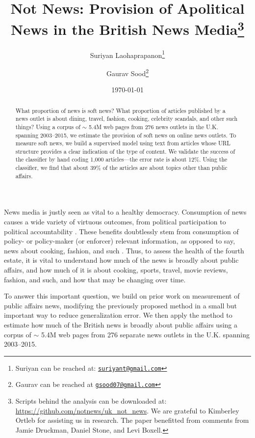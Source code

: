 \documentclass[12pt, letterpaper]{article}
\title{\Large{Not News: Provision of Apolitical News in the British News Media}\footnote{Scripts behind the analysis can be downloaded at: \url{https://github.com/notnews/uk_not_news}. We are grateful to Kimberley Ortleb for assisting us in research. The paper benefitted from comments from Jamie Druckman, Daniel Stone, and Levi Boxell.}}
\author{Suriyan Laohaprapanon\thanks{Suriyan can be reached at: \href{mailto:suriyant@gmail.com}{\footnotesize{\texttt{suriyant@gmail.com}}}}\vspace{.5cm} \and Gaurav Sood\thanks{Gaurav can be reached at \href{mailto:gsood07@gmail.com}{\footnotesize{\texttt{gsood07@gmail.com}}}}}
\date{\vspace{.5cm}\normalsize{\today}}
\begin{document}
\maketitle

\begin{abstract}
\noindent What proportion of news is soft news? What proportion of articles published by a news outlet is about dining, travel, fashion, cooking, celebrity scandals, and other such things? Using a corpus of $\sim$ 5.4M web pages from 276 news outlets in the U.K. spanning 2003--2015, we estimate the provision of soft news on online news outlets. To measure soft news, we build a supervised model using text from articles whose URL structure provides a clear indication of the type of content. We validate the success of the classifier by hand coding 1,000 articles---the error rate is about 12\%. Using the classifier, we find that about 39\% of the articles are about topics other than public affairs. 
\end{abstract}

\clearpage
\doublespacing

News media is justly seen as vital to a healthy democracy. Consumption of news causes a wide variety of virtuous outcomes, from political participation to political accountability \citep{gentzkow2015, oberholzer2006media, snyder2008press, stromberg2004radio}. These benefits doubtlessly stem from consumption of policy- or policy-maker (or enforcer) relevant information, as opposed to say, news about cooking, fashion, and such \citep[see, for instance,][]{prior2003}. Thus, to assess the health of the fourth estate, it is vital to understand how much of the news is broadly about public affairs, and how much of it is about cooking, sports, travel, movie reviews, fashion, and such, and how that may be changing over time.

To answer this important question, we build on prior work on measurement of public affairs news, modifying the previously proposed method in a small but important way to reduce generalization error. We then apply the method to estimate how much of the British news is broadly about public affairs using a corpus of $\sim$ 5.4M web pages from 276 separate news outlets in the U.K. spanning 2003--2015. 
\end{document}
